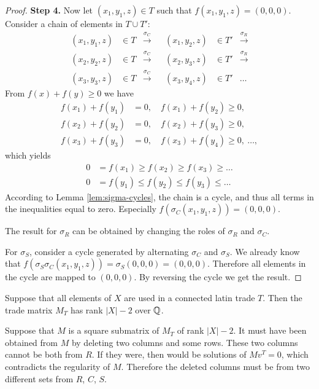 \begin{proof}
%
%
\item \textbf{Step 4.}
Now let $(x_1,y_1,z) \in T$ such that $f(x_1,y_1,z)=(0,0,0)$. Consider a chain of elements in $T \cup T'$:
\begin{align*}
	(x_1,y_1,z) &\in T &\xrightarrow{\sigma_C}& &(x_1,y_2,z) &\in T' & \xrightarrow{\sigma_R} \\
	(x_2,y_2,z) &\in T &\xrightarrow{\sigma_C}& &(x_2,y_3,z) &\in T' & \xrightarrow{\sigma_R} \\
	(x_3,y_3,z) &\in T &\xrightarrow{\sigma_C}& &(x_3,y_4,z) &\in T' & \dots
\end{align*}
From $f(x) + f(y) \geq 0$ we have
\begin{align*}
	f(x_1) + f(y_1) &= 0, \quad f(x_1) + f(y_2) \geq 0, \\
	f(x_2) + f(y_2) &= 0, \quad f(x_2) + f(y_3) \geq 0, \\
	f(x_3) + f(y_3) &= 0, \quad f(x_3) + f(y_4) \geq 0,\ \dots, 
\end{align*}
which yields
\begin{align*}
	0 &= f(x_1) \geq f(x_2) \geq f(x_3) \geq \dots \\
	0 &= f(y_1) \leq f(y_2) \leq f(y_3) \leq \dots
\end{align*}
According to Lemma \ref{lem:sigma-cycles}, the chain is a cycle, and thus all terms in the inequalities equal to zero. Especially $f(\sigma_C(x_1,y_1,z)) = (0,0,0)$.

The result for $\sigma_R$ can be obtained by changing the roles of $\sigma_R$ and $\sigma_C$.

For $\sigma_S$, consider a cycle generated by alternating $\sigma_C$ and $\sigma_S$. We already know that $f(\sigma_S\sigma_C(x_1,y_1,z)) = \sigma_S(0,0,0) = (0,0,0)$. Therefore all elements in the cycle are mapped to $(0,0,0)$. By reversing the cycle we get the result.

\end{proof}

\begin{cor}
\label{cor:rank-mt}
Suppose that all elements of $X$ are used in a connected latin trade $T$. Then the trade matrix $M_T$ has rank $|X|-2$ over $\mathbb Q$.
\end{cor}

\begin{note}
Suppose that $M$ is a square submatrix of $M_T$ of rank $|X|-2$. It must have been obtained from $M$ by deleting two columns and some rows. These two columns cannot be both from $R$. If they were, then
%
would be solutions of $Mv^T = 0$, which contradicts the regularity of $M$. Therefore the deleted columns must be from two different sets from $R$, $C$, $S$.
\end{note}


